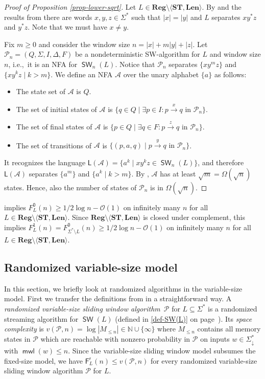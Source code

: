 \documentclass{theoretics}
\newcommand{\N}{\mathbb{N}}
\newcommand{\A}{\mathcal{A}}
\renewcommand{\O}{\mathcal{O}}
\renewcommand{\P}{\mathcal{P}}
\newcommand{\F}{\mathsf{F}}
\renewcommand{\L}{\mathsf{L}}
\renewcommand{\r}{\mathsf{r}}
\DeclareMathOperator{\mwl}{\mathsf{mwl}}
\DeclareMathOperator{\SW}{\mathsf{SW}}
\newcommand{\Reg}{\mathbf{Reg}}
\newcommand{\Len}{\mathbf{Len}}
\newcommand{\ST}{\mathbf{ST}}
\renewcommand{\geq}{\geqslant}
\renewcommand{\leq}{\leqslant}
\renewcommand{\le}{\leq}
\begin{document}
\begin{proof}[Proof of Proposition \ref{prop-lower-sqrt}]
Let $L \in \Reg \setminus \langle \ST, \Len \rangle$.
By  and the results from 
there are words $x,y,z \in \Sigma^*$ such that $|x|=|y|$ and
$L$ separates $x y^* z$ and $y^* z$.
Note that we must have $x \neq y$.

Fix $m \geq 0$ and consider the window size $n  =  |x| + m|y| + |z|$.
Let $\P_n = (Q,\Sigma,I,\Delta,F)$ be a nondeterministic SW-algorithm for $L$ and window size $n$,
i.e.,~it is an NFA for $\SW_n(L)$.
Notice that $\P_n$ separates $\{x y^m z\}$ and $\{ x y^k z \mid k > m\}$.
We define an NFA $\A$ over the unary alphabet $\{a\}$ as follows:
\begin{itemize}
\item The state set of $\A$ is $Q$.
\item The set of initial states of $\A$ is $\{ q \in Q \mid \exists p \in I \colon p \xrightarrow{ x } q \text{ in } \P_n \}$.
\item The set of final states of $\A$  is $\{ p \in Q \mid \exists q \in F \colon p \xrightarrow{ z } q \text{ in } \P_n \}$.
\item The set of transitions of $\A$ is $\{ (p,a,q) \mid p \xrightarrow{y} q \text{ in } \P_n \}$.
\end{itemize}
It recognizes the language $\L(\A) = \{ a^k \mid x y^k z \in \SW_n(L) \}$,
and therefore $\L(\A)$ separates $\{a^m\}$ and $\{ a^k \mid k > m \}$.
By , $\A$ has at least $\sqrt{m} = \Omega(\sqrt{n})$ states.
Hence, also the number of states of $\P_n$ is in $\Omega(\sqrt{n})$.
\end{proof}

  implies $F^\mathsf{0}_L(n) \geq 1/2 \log n - \O(1)$ on infinitely many $n$ 
 for all $L \in \Reg \setminus \langle \ST, \Len \rangle$.
Since $\Reg \setminus \langle \ST, \Len \rangle$ is closed under complement,
this implies $F^\mathsf{1}_L(n)=F^\mathsf{0}_{\Sigma^* \setminus L}(n) \geq 1/2 \log n - \O(1)$ 
on infinitely many $n$ for all $L \in \Reg \setminus \langle \ST, \Len \rangle$.

\subsection{Randomized variable-size model} \label{sec-randomized-variable}

In this section, we briefly look at randomized algorithms in the variable-size model.
First we transfer the definitions from  in a straightforward way.
A {\em randomized variable-size sliding window algorithm}~$\P$ for $L \subseteq \Sigma^*$
is a randomized streaming algorithm for $\SW(L)$ (defined in \eqref{def-SW(L)} on page~\pageref{def-SW(L)}).
Its {\em space complexity} is $v(\P,n) = \log |M_{\le n}| \in \N \cup \{\infty\}$
where $M_{\le n}$ contains all memory states in $\P$ which are reachable with nonzero probability in $\P$
on inputs $w \in \Sigma_\downarrow^*$ with $\mwl(w) \le n$.
Since the variable-size sliding window model subsumes the fixed-size model,
we have $\F^\r_L(n) \le v(\P,n)$ for every randomized variable-size
sliding window algorithm $\P$ for $L$.
\end{document}
